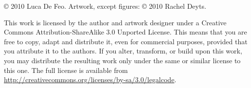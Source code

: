 \begin{titlingpage}
  \bigskip

  \copyright{} 2010 Luca De Feo.  \ifartwork Artwork, except figures:
  \copyright{} 2010 Rachel Deyts.\fi

  \smallskip

  \href{http://creativecommons.org/licenses/by-sa/3.0}{}
  This work is licensed by the author \ifartwork and artwork designer
  \fi under a Creative Commons Attribution-ShareAlike 3.0 Unported
  License. This means that you are free to copy, adapt and distribute
  it, even for commercial purposes, provided that you attribute it to
  the author\ifartwork s\fi.  If you alter, transform, or build upon
  this work, you may distribute the resulting work only under the same
  or similar license to this one.  The full license is available from
  \url{http://creativecommons.org/licenses/by-sa/3.0/legalcode}.
\end{titlingpage}

